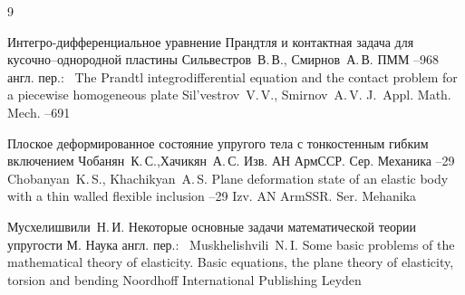 \begin{thebibliography}{9}

\paper Интегро-дифференциальное уравнение Прандтля и контактная задача для кусочно--однородной пластины
\by Сильвестров~В.\,В., Смирнов~А.\,В.
\jour ПММ
--968
\transl англ. пер.:~
\paper The Prandtl integrodifferential equation and the contact problem for a piecewise homogeneous plate
\by Sil'vestrov~V.\,V., Smirnov~A.\,V.
\jour J.~Appl. Math. Mech. 
--691 

\paper Плоское деформированное состояние упругого тела с тонкостенным гибким включением
\by Чобанян~К.\,С.,Хачикян~А.\,С.
\jour Изв. АН АрмССР. Сер. Механика
--29
\misctransl
\by Chobanyan~K.\,S., Khachikyan~A.\,S.
\paper Plane deformation state of an elastic body with a thin walled flexible inclusion
--29
\jour Izv. AN ArmSSR. Ser. Mehanika

\by Мусхелишвили~Н.\,И.
\book Некоторые основные задачи математической теории упругости
\publaddr М.
\publ Наука
\transl
англ. пер.:~
\by Muskhelishvili~N.\,I.
\book Some basic problems of the mathematical theory of elasticity. Basic equations, the plane theory of elasticity, torsion and bending
\publ Noordhoff International Publishing
\publaddr Leyden

\end{thebibliography}

\noindent
\hskip6.5cm \thedate \par\noindent
\hskip6.5cm\therevdate\par

\newpage



\makeengtitlem

\renewcommand{\baselinestretch}{0.9}

\newpage

%
